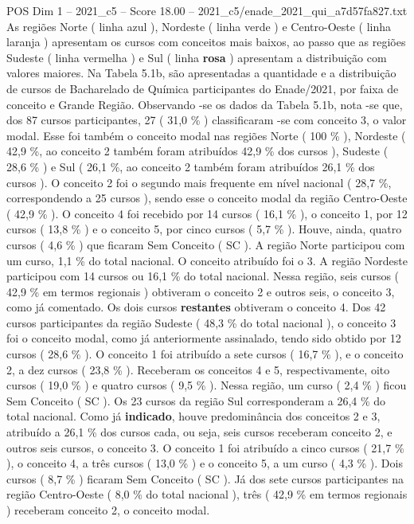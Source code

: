 \begin{textsample}{POS Dim 1 – 2021\_c5 – Score 18.00 – 2021\_c5/enade\_2021\_qui\_a7d57fa827.txt}
As regiões Norte ( linha azul ), Nordeste ( linha verde ) e Centro-Oeste ( linha laranja ) apresentam os cursos com conceitos mais baixos, ao passo que as regiões Sudeste ( linha vermelha ) e Sul ( linha \textbf{rosa} ) apresentam a distribuição com valores maiores.
Na Tabela 5.1b, são apresentadas a quantidade e a distribuição de cursos de Bacharelado de Química participantes do Enade/2021, por faixa de conceito e Grande Região.
Observando -se os dados da Tabela 5.1b, nota -se que, dos 87 cursos participantes, 27 ( 31,0 \% ) classificaram -se com conceito 3, o valor modal.
Esse foi também o conceito modal nas regiões Norte ( 100 \% ), Nordeste ( 42,9 \%, ao conceito 2 também foram atribuídos 42,9 \% dos cursos ), Sudeste ( 28,6 \% ) e Sul ( 26,1 \%, ao conceito 2 também foram atribuídos 26,1 \% dos cursos ).
O conceito 2 foi o segundo mais frequente em nível nacional ( 28,7 \%, correspondendo a 25 cursos ), sendo esse o conceito modal da região Centro-Oeste ( 42,9 \% ).
O conceito 4 foi recebido por 14 cursos ( 16,1 \% ), o conceito 1, por 12 cursos ( 13,8 \% ) e o conceito 5, por cinco cursos ( 5,7 \% ).
Houve, ainda, quatro cursos ( 4,6 \% ) que ficaram Sem Conceito ( SC ).
A região Norte participou com um curso, 1,1 \% do total nacional.
O conceito atribuído foi o 3.
A região Nordeste participou com 14 cursos ou 16,1 \% do total nacional.
Nessa região, seis cursos ( 42,9 \% em termos regionais ) obtiveram o conceito 2 e outros seis, o conceito 3, como já comentado.
Os dois cursos \textbf{restantes} obtiveram o conceito 4.
Dos 42 cursos participantes da região Sudeste ( 48,3 \% do total nacional ), o conceito 3 foi o conceito modal, como já anteriormente assinalado, tendo sido obtido por 12 cursos ( 28,6 \% ).
O conceito 1 foi atribuído a sete cursos ( 16,7 \% ), e o conceito 2, a dez cursos ( 23,8 \% ).
Receberam os conceitos 4 e 5, respectivamente, oito cursos ( 19,0 \% ) e quatro cursos ( 9,5 \% ).
Nessa região, um curso ( 2,4 \% ) ficou Sem Conceito ( SC ).
Os 23 cursos da região Sul corresponderam a 26,4 \% do total nacional.
Como já \textbf{indicado}, houve predominância dos conceitos 2 e 3, atribuído a 26,1 \% dos cursos cada, ou seja, seis cursos receberam conceito 2, e outros seis cursos, o conceito 3.
O conceito 1 foi atribuído a cinco cursos ( 21,7 \% ), o conceito 4, a três cursos ( 13,0 \% ) e o conceito 5, a um curso ( 4,3 \% ).
Dois cursos ( 8,7 \% ) ficaram Sem Conceito ( SC ).
Já dos sete cursos participantes na região Centro-Oeste ( 8,0 \% do total nacional ), três ( 42,9 \% em termos regionais ) receberam conceito 2, o conceito modal.

\end{textsample}
